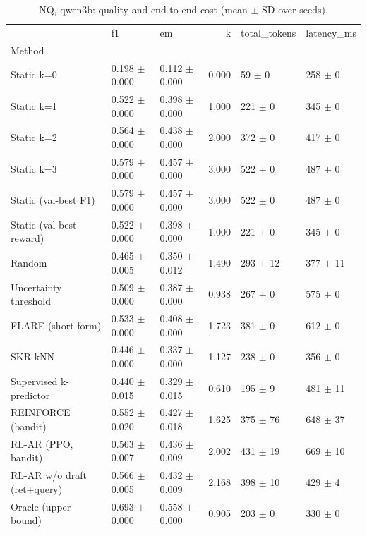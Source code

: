 \begin{table}
\caption{NQ, qwen3b: quality and end-to-end cost (mean $\pm$ SD over seeds).}
\begin{tabular}{lllrll}
\toprule
 & f1 & em & k & total_tokens & latency_ms \\
Method &  &  &  &  &  \\
\midrule
Static k=0 & 0.198 $\pm$ 0.000 & 0.112 $\pm$ 0.000 & 0.000 & 59 $\pm$ 0 & 258 $\pm$ 0 \\
Static k=1 & 0.522 $\pm$ 0.000 & 0.398 $\pm$ 0.000 & 1.000 & 221 $\pm$ 0 & 345 $\pm$ 0 \\
Static k=2 & 0.564 $\pm$ 0.000 & 0.438 $\pm$ 0.000 & 2.000 & 372 $\pm$ 0 & 417 $\pm$ 0 \\
Static k=3 & 0.579 $\pm$ 0.000 & 0.457 $\pm$ 0.000 & 3.000 & 522 $\pm$ 0 & 487 $\pm$ 0 \\
Static (val-best F1) & 0.579 $\pm$ 0.000 & 0.457 $\pm$ 0.000 & 3.000 & 522 $\pm$ 0 & 487 $\pm$ 0 \\
Static (val-best reward) & 0.522 $\pm$ 0.000 & 0.398 $\pm$ 0.000 & 1.000 & 221 $\pm$ 0 & 345 $\pm$ 0 \\
Random & 0.465 $\pm$ 0.005 & 0.350 $\pm$ 0.012 & 1.490 & 293 $\pm$ 12 & 377 $\pm$ 11 \\
Uncertainty threshold & 0.509 $\pm$ 0.000 & 0.387 $\pm$ 0.000 & 0.938 & 267 $\pm$ 0 & 575 $\pm$ 0 \\
FLARE (short-form) & 0.533 $\pm$ 0.000 & 0.408 $\pm$ 0.000 & 1.723 & 381 $\pm$ 0 & 612 $\pm$ 0 \\
SKR-kNN & 0.446 $\pm$ 0.000 & 0.337 $\pm$ 0.000 & 1.127 & 238 $\pm$ 0 & 356 $\pm$ 0 \\
Supervised k-predictor & 0.440 $\pm$ 0.015 & 0.329 $\pm$ 0.015 & 0.610 & 195 $\pm$ 9 & 481 $\pm$ 11 \\
REINFORCE (bandit) & 0.552 $\pm$ 0.020 & 0.427 $\pm$ 0.018 & 1.625 & 375 $\pm$ 76 & 648 $\pm$ 37 \\
RL-AR (PPO, bandit) & 0.563 $\pm$ 0.007 & 0.436 $\pm$ 0.009 & 2.002 & 431 $\pm$ 19 & 669 $\pm$ 10 \\
RL-AR w/o draft (ret+query) & 0.566 $\pm$ 0.005 & 0.432 $\pm$ 0.009 & 2.168 & 398 $\pm$ 10 & 429 $\pm$ 4 \\
Oracle (upper bound) & 0.693 $\pm$ 0.000 & 0.558 $\pm$ 0.000 & 0.905 & 203 $\pm$ 0 & 330 $\pm$ 0 \\
\bottomrule
\end{tabular}
\end{table}
